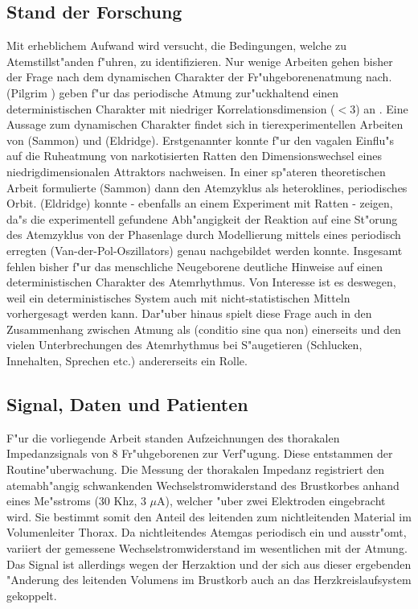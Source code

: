 \subsection{Stand der Forschung}

Mit erheblichem Aufwand wird versucht, die Bedingungen, welche zu Atemstillst"anden
f"uhren, zu identifizieren.  Nur
wenige Arbeiten gehen bisher der Frage nach dem dynamischen Charakter der
Fr"uhgeborenenatmung nach. \autor(Pilgrim \etal) geben f"ur das periodische Atmung
zur"uckhaltend einen deterministischen Charakter mit niedriger Korrelationsdimension
($<3$) an \cite{Pilgram94}. Eine Aussage zum dynamischen Charakter findet sich in
tierexperimentellen Arbeiten von \autor(Sammon) und \autor(Eldridge). Erstgenannter konnte
f"ur den vagalen Einflu"s auf die Ruheatmung von narkotisierten Ratten den
Dimensionswechsel eines niedrigdimensionalen Attraktors nachweisen. In einer sp"ateren
theoretischen Arbeit formulierte \autor(Sammon) dann den Atemzyklus als heteroklines,
periodisches Orbit. \autor(Eldridge) konnte - ebenfalls an einem Experiment mit Ratten -
zeigen, da"s die experimentell gefundene Abh"angigkeit der Reaktion auf eine St"orung des
Atemzyklus von der Phasenlage durch Modellierung mittels eines periodisch erregten
\begriff(Van-der-Pol-Oszillators) genau nachgebildet werden konnte.  Insgesamt fehlen
bisher f"ur das menschliche Neugeborene deutliche Hinweise auf einen deterministischen
Charakter des Atemrhythmus. Von Interesse ist es deswegen, weil ein deterministisches
System auch mit nicht-statistischen Mitteln vorhergesagt werden kann. Dar"uber hinaus
spielt diese Frage auch in den Zusammenhang zwischen Atmung als \begriff(conditio sine qua
non) einerseits und den vielen Unterbrechungen des Atemrhythmus bei S"augetieren
(Schlucken, Innehalten, Sprechen etc.) andererseits ein Rolle.

\subsection{Signal, Daten und Patienten}

F"ur die vorliegende Arbeit standen Aufzeichnungen des thorakalen Impedanzsignals von 8
Fr"uhgeborenen zur Verf"ugung. Diese entstammen der Routine"uberwachung. Die Messung der
thorakalen Impedanz registriert den atemabh"angig schwankenden Wechselstromwiderstand des
Brustkorbes anhand eines Me"sstroms (30 Khz, 3 $\mu$A), welcher "uber zwei Elektroden
eingebracht wird. Sie bestimmt somit den Anteil des leitenden zum nichtleitenden Material
im Volumenleiter Thorax. Da nichtleitendes Atemgas periodisch ein und ausstr"omt, variiert
der gemessene Wechselstromwiderstand im wesentlichen mit der Atmung. Das Signal ist allerdings
wegen der Herzaktion und der sich aus dieser ergebenden "Anderung des leitenden Volumens
im Brustkorb auch an das Herzkreislaufsystem gekoppelt. 

